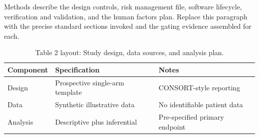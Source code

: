 
Methods describe the design controls, risk management file, software lifecycle, verification and validation, and the human factors plan. Replace this paragraph with the precise standard sections invoked and the gating evidence assembled for each.

\begin{table}[H]
\caption{Table 2 layout: Study design, data sources, and analysis plan.}
\label{tab:methods_design}
\centering
\begin{tabular}{>{\raggedright\arraybackslash}p{3.4cm} >{\raggedright\arraybackslash}p{4.6cm} >{\raggedright\arraybackslash}p{5.4cm}}
\toprule
\textbf{Component} & \textbf{Specification} & \textbf{Notes} \\
\midrule
  Design & Prospective single-arm template & CONSORT-style reporting \\
  Data & Synthetic illustrative data & No identifiable patient data \\
  Analysis & Descriptive plus inferential & Pre-specified primary endpoint \\
\bottomrule
\end{tabular}
\end{table}

